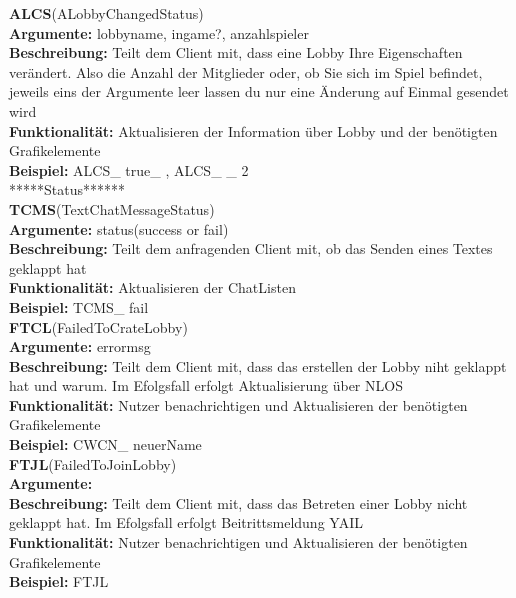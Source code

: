 \documentclass[a4paper, 12pt, oneside, headsepline=.5pt,footsepline=.5pt]{scrartcl}
\begin{document}
{\large \textbf{ALCS}(ALobbyChangedStatus)} \\
\hspace{4ex} \textbf{Argumente:} {lobbyname, ingame?, anzahlspieler} \\
\hspace{4ex} \textbf{Beschreibung:} {Teilt dem Client mit, dass eine Lobby Ihre Eigenschaften verändert. Also die Anzahl der Mitglieder oder, ob Sie sich im Spiel befindet, jeweils eins der Argumente leer lassen du nur eine Änderung auf Einmal gesendet wird} \\
\hspace{4ex} \textbf{Funktionalität:} {Aktualisieren der Information über Lobby und der benötigten Grafikelemente}  \\
\hspace{4ex} \textbf{Beispiel:} {ALCS\_ true\_ , ALCS\_ \_ 2} \\
*****Status****** \\
{\large \textbf{TCMS}(TextChatMessageStatus)} \\
\hspace{4ex} \textbf{Argumente:} {status(success or fail)} \\
\hspace{4ex} \textbf{Beschreibung:} {Teilt dem anfragenden Client mit, ob das Senden eines Textes geklappt hat} \\
\hspace{4ex} \textbf{Funktionalität:} {Aktualisieren der ChatListen}  \\
\hspace{4ex} \textbf{Beispiel:} {TCMS\_ fail} \\

{\large \textbf{FTCL}(FailedToCrateLobby)} \\
\hspace{4ex} \textbf{Argumente:} {errormsg} \\
\hspace{4ex} \textbf{Beschreibung:} {Teilt dem Client mit, dass das erstellen der Lobby niht geklappt hat und warum. Im Efolgsfall erfolgt Aktualisierung über NLOS} \\
\hspace{4ex} \textbf{Funktionalität:} {Nutzer benachrichtigen und Aktualisieren der benötigten Grafikelemente} \\
\hspace{4ex} \textbf{Beispiel:} {CWCN\_ neuerName} \\

{\large \textbf{FTJL}(FailedToJoinLobby)} \\
\hspace{4ex} \textbf{Argumente:} {} \\
\hspace{4ex} \textbf{Beschreibung:} {Teilt dem Client mit, dass das Betreten einer Lobby nicht geklappt hat. Im Efolgsfall erfolgt Beitrittsmeldung YAIL} \\
\hspace{4ex} \textbf{Funktionalität:} {Nutzer benachrichtigen und Aktualisieren der benötigten Grafikelemente} \\
\hspace{4ex} \textbf{Beispiel:} {FTJL} \\
\end{document}
